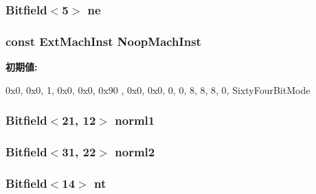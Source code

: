 \label{namespaceX86ISA_a8e62af5576a372dc91c099b42e1541f4}
\hypertarget{namespaceX86ISA_a35dcb8af6346f44d62932d07e62d6ab9}{
\subsubsection[{ne}]{\setlength{\rightskip}{0pt plus 5cm}Bitfield$<$5$>$ {\bf ne}}}
\label{namespaceX86ISA_a35dcb8af6346f44d62932d07e62d6ab9}
\hypertarget{namespaceX86ISA_a8d1e39e0ea757dcc9725c6ccd81dd4c4}{
\subsubsection[{NoopMachInst}]{\setlength{\rightskip}{0pt plus 5cm}const {\bf ExtMachInst} {\bf NoopMachInst}}}
\label{namespaceX86ISA_a8d1e39e0ea757dcc9725c6ccd81dd4c4}
{\bfseries 初期値:}
\begin{DoxyCode}
 {
        0x0,                            
        0x0,                            
        { 1, 0x0, 0x0, 0x90 },          
        0x0, 0x0,                       
        0, 0,                           
        8, 8, 8,                        
        0,                              
        SixtyFourBitMode                
                                        
    }
\end{DoxyCode}
\hypertarget{namespaceX86ISA_aa4dcc3fc4835349492b2c3024ae2a224}{
\subsubsection[{norml1}]{\setlength{\rightskip}{0pt plus 5cm}Bitfield$<$21, 12$>$ {\bf norml1}}}
\label{namespaceX86ISA_aa4dcc3fc4835349492b2c3024ae2a224}
\hypertarget{namespaceX86ISA_a8820b4b084a309650068f08c9f0d54ae}{
\subsubsection[{norml2}]{\setlength{\rightskip}{0pt plus 5cm}Bitfield$<$31, 22$>$ {\bf norml2}}}
\label{namespaceX86ISA_a8820b4b084a309650068f08c9f0d54ae}
\hypertarget{namespaceX86ISA_afd38951fdccb8fcb42b2f42cac8c7d61}{
\subsubsection[{nt}]{\setlength{\rightskip}{0pt plus 5cm}Bitfield$<$14$>$ {\bf nt}}}
